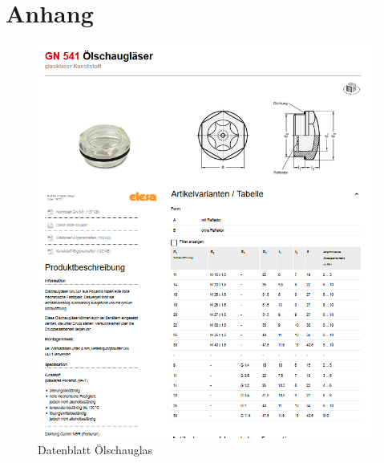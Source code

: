 \chapter{Anhang}
\newpage
\begin{figure}[H]
	\includegraphics[width=1.1\textwidth,keepaspectratio]{figures/Oelschauglas.png}
	\caption{Datenblatt Ölschauglas \protect\cite{bib:www:schauglas}}
	\label{fig:schauglas }
\end{figure}

